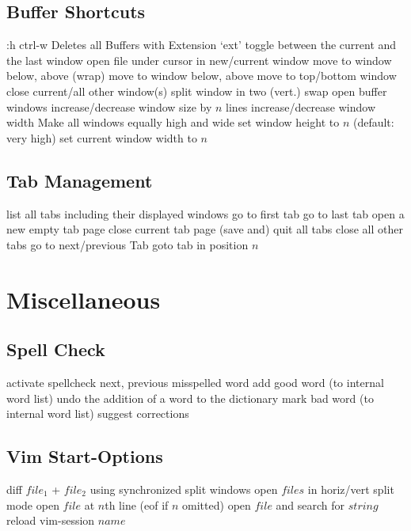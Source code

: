 \subsection{Buffer Shortcuts}	{:h ctrl-w }
	{Deletes all Buffers with Extension `ext'}
\cmdS{\ctrl \^{} }	{toggle between the current and the last window}
	{open file under cursor in new/current window}
	{move to window below, above (wrap)}
	{move to window below, above}
	{move to top/bottom window}
	{close current/all other window(s)}
	{split window in two (vert.)}
	{swap open buffer windows }
	{increase/decrease window size by $n$ lines}
	{increase/decrease window width}
	{Make all windows equally high and wide}
	{set window height to $n$ (default: very high) }
	{set current window width to $n$ }

\subsection{Tab Management}	{}
	{list all tabs including their displayed windows}
	{go to first tab}
	{go to last tab}
	{open a new empty tab page}
	{close current tab page}
	{(save and) quit all tabs}
	{close all other tabs}
	{go to next/previous Tab}
	{goto tab in position $n$ }

\section{Miscellaneous}	{}

\subsection{Spell Check}	{}
	{activate spellcheck}
\cmdS{]s\ [s }	{next, previous misspelled word}
	{add good word (to internal word list)}
	{undo the addition of a word to the dictionary}
	{mark bad word (to internal word list)}
	{suggest corrections}

\subsection{Vim Start-Options}	{}
	{diff $file_1$ + $file_2$ using synchronized split windows}
	{open $files$ in horiz/vert split mode}
	{open $file$ at $n$th line (eof if $n$ omitted)}
	{open $file$ and search for $string$ }
	{reload vim-session $name$}

